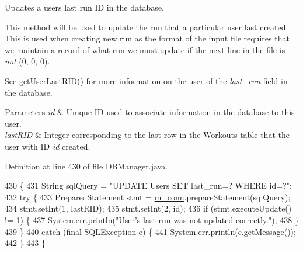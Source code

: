 Updates a user\textquotesingle{}s last run ID in the database.

This method will be used to update the run that a particular user last created. This is used when creating new run as the format of the input file requires that we maintain a record of what run we must update if the next line in the file is {\itshape not} (0, 0, 0).

See \mbox{\hyperlink{classcom_1_1activitytracker_1_1_d_b_manager_aab14c61b3f3a17bdea10cab1b5fd9337}{get\+User\+Last\+R\+I\+D()}} for more information on the user of the {\itshape last\+\_\+run} field in the database.


\begin{DoxyParams}{Parameters}
{\em id} & Unique ID used to associate information in the database to this user. \\
\hline
{\em last\+R\+ID} & Integer corresponding to the last row in the Workouts table that the user with ID {\itshape id} created. \\
\hline
\end{DoxyParams}


Definition at line 430 of file D\+B\+Manager.\+java.


\begin{DoxyCode}
430                                                                 \{
431         String sqlQuery = \textcolor{stringliteral}{"UPDATE Users SET last\_run=? WHERE id=?"};
432         \textcolor{keywordflow}{try} \{
433             PreparedStatement stmt = \mbox{\hyperlink{classcom_1_1activitytracker_1_1_d_b_manager_a064088d13ac09eb147fdc19268771521}{m\_conn}}.prepareStatement(sqlQuery);
434             stmt.setInt(1, lastRID);
435             stmt.setInt(2, \textcolor{keywordtype}{id});
436             \textcolor{keywordflow}{if} (stmt.executeUpdate() != 1) \{
437                 System.err.println(\textcolor{stringliteral}{"User's last run was not updated correctly."});
438             \}
439         \}
440         \textcolor{keywordflow}{catch} (\textcolor{keyword}{final} SQLException e) \{
441             System.err.println(e.getMessage());
442         \}
443     \}
\end{DoxyCode}
\mbox{\label{classcom_1_1activitytracker_1_1_d_b_manager_af05d79f33ecf2920a67d1b9cf82c079f}} 
